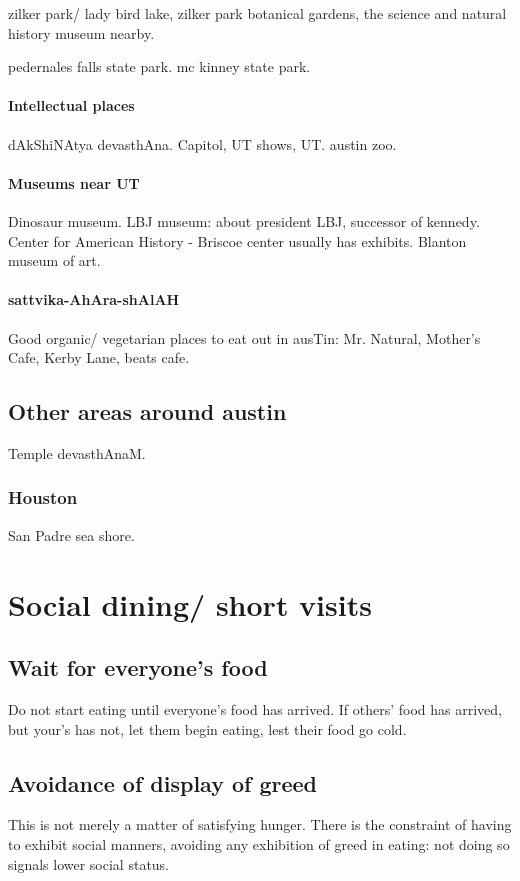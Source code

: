 \documentclass[oneside, article]{memoir}
\begin{document}
zilker park/ lady bird lake, zilker park botanical gardens, the science and natural history museum nearby.

pedernales falls state park. mc kinney state park.

\paragraph*{Intellectual places}
dAkShiNAtya devasthAna. Capitol, UT shows, UT. austin zoo.

\paragraph*{Museums near UT}
Dinosaur museum. LBJ museum: about president LBJ, successor of kennedy. Center for American History - Briscoe center usually has exhibits. Blanton museum of art.

\paragraph*{sattvika-AhAra-shAlAH}
Good organic/ vegetarian places to eat out in ausTin: Mr. Natural, Mother's Cafe, Kerby Lane, beats cafe.

\subsection{Other areas around austin}
Temple devasthAnaM.

\subsubsection{Houston}
San Padre sea shore.


\section{Social dining/ short visits}
\subsection{Wait for everyone's food}
Do not start eating until everyone's food has arrived. If others' food has arrived, but your's has not, let them begin eating, lest their food go cold.

\subsection{Avoidance of display of greed}
This is not merely a matter of satisfying hunger. There is the constraint of having to exhibit social manners, avoiding any exhibition of greed in eating: not doing so signals lower social status.
\end{document}
